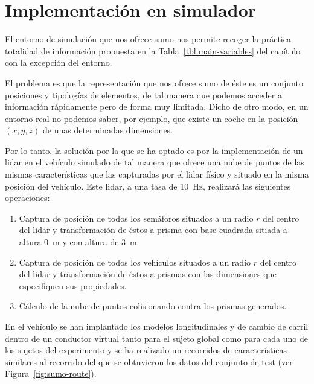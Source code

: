 \chapter{Implementación en simulador}
\label{ch:simulation-implementation}

El entorno de simulación que nos ofrece \ac{sumo} nos permite recoger la práctica totalidad de información propuesta en la Tabla~\ref{tbl:main-variables} del capítulo  con la excepción del entorno.

El problema es que la representación que nos ofrece \ac{sumo} de éste es un conjunto posiciones y tipologías de elementos, de tal manera que podemos acceder a información rápidamente pero de forma muy limitada. Dicho de otro modo, en un entorno real no podemos saber, por ejemplo, que existe un coche en la posición $(x, y, z)$ de unas determinadas dimensiones.

Por lo tanto, la solución por la que se ha optado es por la implementación de un \ac{lidar} en el vehículo simulado de tal manera que ofrece una nube de puntos de las mismas características que las capturadas por el \ac{lidar} físico y situado en la misma posición del vehículo. Este \ac{lidar}, a una tasa de \SI{10}{\hertz}, realizará las siguientes operaciones:

\begin{enumerate}
	\item Captura de posición de todos los semáforos situados a un radio $r$ del centro del \ac{lidar} y transformación de éstos a prisma con base cuadrada sitiada a altura \SI{0}{\meter} y con altura de \SI{3}{\meter}.
	\item Captura de posición de todos los vehículos situados a un radio $r$ del centro del \ac{lidar} y transformación de éstos a prismas con las dimensiones que especifiquen sus propiedades.
	\item Cálculo de la nube de puntos colisionando contra los prismas generados.
\end{enumerate}

En el vehículo se han implantado los modelos longitudinales y de cambio de carril dentro de un conductor virtual tanto para el sujeto global como para cada uno de los sujetos del experimento y se ha realizado un recorridos de características similares al recorrido del que se obtuvieron los datos del conjunto de test (ver Figura~\ref{fig:sumo-route}).

